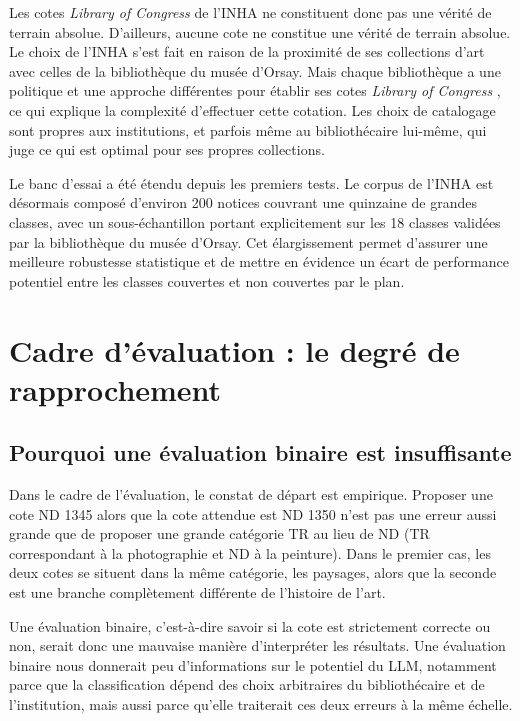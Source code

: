  Les cotes \textit{Library of Congress}  de l’INHA ne constituent donc pas une vérité de terrain absolue. D’ailleurs, aucune cote ne constitue une vérité de terrain absolue. Le choix de l’INHA s’est fait en raison de la proximité de ses collections d’art avec celles de la bibliothèque du musée d’Orsay. 
Mais chaque bibliothèque a une politique et une approche différentes pour  établir ses cotes \textit{Library of Congress} , ce qui explique la complexité d’effectuer cette cotation.
Les choix de catalogage sont propres aux institutions, et parfois même au bibliothécaire lui-même, qui juge ce qui est optimal pour ses propres collections.

Le banc d’essai a été étendu depuis les premiers tests. Le corpus de l’INHA est désormais composé d’environ 200 notices couvrant une quinzaine de grandes classes, avec un sous-échantillon portant explicitement sur les 18 classes validées par la bibliothèque du musée d’Orsay. Cet élargissement permet d’assurer une meilleure robustesse statistique et de mettre en évidence un écart de performance potentiel entre les classes couvertes et non couvertes par le plan.


\section{Cadre d'évaluation : le degré de rapprochement}

\subsection{Pourquoi une évaluation binaire est insuffisante}
Dans le cadre de l'évaluation, le constat de départ est empirique. Proposer une cote ND 1345 alors que la cote attendue est ND 1350 n'est pas une erreur aussi grande que de proposer une grande catégorie TR au lieu de ND (TR correspondant à la photographie et ND à la peinture). Dans le premier cas, les deux cotes se situent dans la même catégorie, les paysages, alors que la seconde est une branche complètement différente de l'histoire de l'art.

Une évaluation binaire, c'est-à-dire savoir si la cote est strictement correcte ou non, serait donc une mauvaise manière d'interpréter les résultats. Une évaluation binaire nous donnerait peu d'informations sur le potentiel du LLM, notamment parce que la classification dépend des choix arbitraires du bibliothécaire et de l'institution, mais aussi parce qu'elle traiterait ces deux erreurs à la même échelle.

